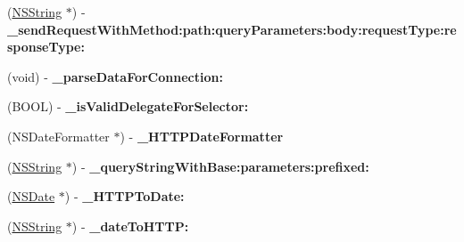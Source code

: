 \begin{DoxyCompactItemize}
\item 
\hypertarget{interface_m_g_twitter_engine_07_private_methods_08_acbe1126f9da524881bfa24ba7d9ff2ea}{
(\hyperlink{class_n_s_string}{\-N\-S\-String} $\ast$) -\/ {\bfseries \-\_\-send\-Request\-With\-Method\-:path\-:query\-Parameters\-:body\-:request\-Type\-:response\-Type\-:}}
\label{interface_m_g_twitter_engine_07_private_methods_08_acbe1126f9da524881bfa24ba7d9ff2ea}

\item 
\hypertarget{interface_m_g_twitter_engine_07_private_methods_08_aa5185d8aad21adead0f3da06a2a654e8}{
(void) -\/ {\bfseries \-\_\-parse\-Data\-For\-Connection\-:}}
\label{interface_m_g_twitter_engine_07_private_methods_08_aa5185d8aad21adead0f3da06a2a654e8}

\item 
\hypertarget{interface_m_g_twitter_engine_07_private_methods_08_a93985b06c163e8d0175708980d4ebb13}{
(\-B\-O\-O\-L) -\/ {\bfseries \-\_\-is\-Valid\-Delegate\-For\-Selector\-:}}
\label{interface_m_g_twitter_engine_07_private_methods_08_a93985b06c163e8d0175708980d4ebb13}

\item 
\hypertarget{interface_m_g_twitter_engine_07_private_methods_08_aaef5aeb9de9dab3e8669c76e8f6db246}{
(\-N\-S\-Date\-Formatter $\ast$) -\/ {\bfseries \-\_\-\-H\-T\-T\-P\-Date\-Formatter}}
\label{interface_m_g_twitter_engine_07_private_methods_08_aaef5aeb9de9dab3e8669c76e8f6db246}

\item 
\hypertarget{interface_m_g_twitter_engine_07_private_methods_08_aaac37194488c1edd1d960b873b68f69c}{
(\hyperlink{class_n_s_string}{\-N\-S\-String} $\ast$) -\/ {\bfseries \-\_\-query\-String\-With\-Base\-:parameters\-:prefixed\-:}}
\label{interface_m_g_twitter_engine_07_private_methods_08_aaac37194488c1edd1d960b873b68f69c}

\item 
\hypertarget{interface_m_g_twitter_engine_07_private_methods_08_a63e5d7397680b923843dc45578ce5dce}{
(\hyperlink{class_n_s_date}{\-N\-S\-Date} $\ast$) -\/ {\bfseries \-\_\-\-H\-T\-T\-P\-To\-Date\-:}}
\label{interface_m_g_twitter_engine_07_private_methods_08_a63e5d7397680b923843dc45578ce5dce}

\item 
\hypertarget{interface_m_g_twitter_engine_07_private_methods_08_a61eebf5299b79da4d6b9bd411e25c457}{
(\hyperlink{class_n_s_string}{\-N\-S\-String} $\ast$) -\/ {\bfseries \-\_\-date\-To\-H\-T\-T\-P\-:}}
\label{interface_m_g_twitter_engine_07_private_methods_08_a61eebf5299b79da4d6b9bd411e25c457}


\end{DoxyCompactItemize}
